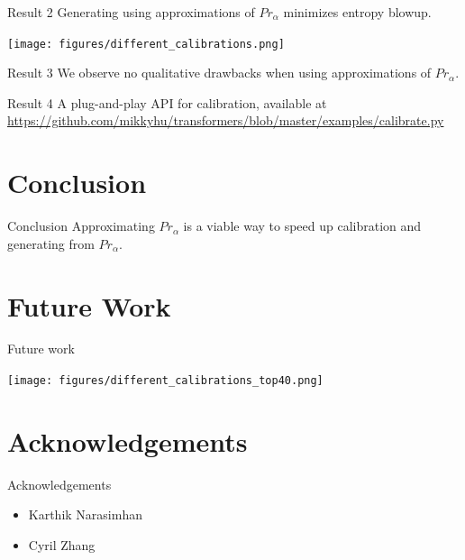 \documentclass{beamer}
\begin{document}
\begin{frame}{Result 2}
    Generating using approximations of $Pr_\alpha$ minimizes entropy blowup.
    \begin{center}
        \texttt{[image: figures/different\_calibrations.png]}
    \end{center}
\end{frame}

\begin{frame}{Result 3}
    We observe no qualitative drawbacks when using approximations of $Pr_\alpha$.
\end{frame}

\begin{frame}{Result 4}
    A plug-and-play API for calibration, available at \url{https://github.com/mikkyhu/transformers/blob/master/examples/calibrate.py}
\end{frame}

\section{Conclusion}
\begin{frame}{Conclusion}
    Approximating $Pr_\alpha$ is a viable way to speed up calibration and generating from $Pr_\alpha$.
\end{frame}

\section{Future Work}
\begin{frame}{Future work}
    \begin{center}
        \texttt{[image: figures/different\_calibrations\_top40.png]}
    \end{center}
\end{frame}

\section{Acknowledgements}
\begin{frame}{Acknowledgements}
    \begin{itemize}
        \item Karthik Narasimhan
        \item Cyril Zhang
    \end{itemize}
    
    
\end{frame}
\end{document}
